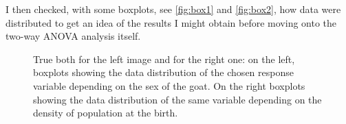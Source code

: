 \documentclass{article}
\begin{document}
I then checked, with some boxplots, see  \autoref{fig:box1} and \autoref{fig:box2}, how data were distributed to get an idea of the results I might obtain before moving onto the two-way ANOVA analysis itself.
\begin{figure}[H]
     \centering
     \caption{True both for the left image and for the right one: on the left, boxplots showing the data distribution of the chosen response variable depending on the sex of the goat. On the right boxplots showing the data distribution of the same variable depending on the density of population at the birth.}
      \qquad
\end{figure}
\end{document}
